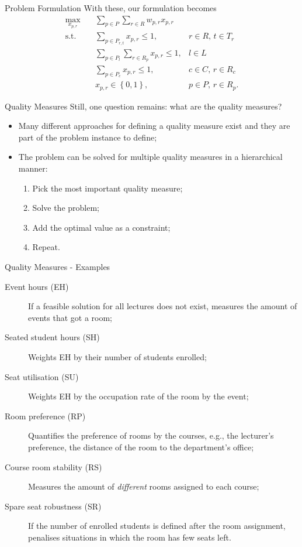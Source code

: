 \documentclass{beamer}
\begin{document}
\begin{frame}{Problem Formulation}
    With these, our formulation becomes
    \begin{align*}
        \max_{x_{p,r}} \quad & \sum_{p \in P} \sum_{r\in R} w_{p,r}x_{p,r} \\
	\textrm{s.t.} \quad & \sum_{p \in P_{r,t}} x_{p,r} \le 1, & r\in R,\,t\in T_r \\
			    & \sum_{p \in P_l} \sum_{r \in R_p} x_{p,r} \le 1, & l \in L \\
			    & \sum_{p \in P_c} x_{p,r} \le 1, & c \in C,\, r \in R_c \\
			    & x_{p,r} \in \left\{ 0,1 \right\}, & p \in P,\, r\in R_p
    .\end{align*}
\end{frame}

\begin{frame}{Quality Measures}
    Still, one question remains: what are the quality measures?

    \begin{itemize}
        \item Many different approaches for defining a quality measure exist and they are part of the problem instance to define;
	\item The problem can be solved for multiple quality measures in a hierarchical manner:
	    \begin{enumerate}
	        \item Pick the most important quality measure;
		\item Solve the problem;
		\item Add the optimal value as a constraint;
		\item Repeat.
	    \end{enumerate}
    \end{itemize}
\end{frame}

\begin{frame}{Quality Measures - Examples}
    \begin{description}
	\item[Event hours (EH)] If a feasible solution for all lectures does not exist, measures the amount of events that got a room;
	\item[Seated student hours (SH)] Weights EH by their number of students enrolled;
	\item[Seat utilisation (SU)] Weights EH by the occupation rate of the room by the event;
	\item[Room preference (RP)] Quantifies the preference of rooms by the courses, e.g., the lecturer's preference, the distance of the room to the department's office;
	\item[Course room stability (RS)] Measures the amount of \emph{different} rooms assigned to each course;
	\item[Spare seat robustness (SR)] If the number of enrolled students is defined after the room assignment, penalises situations in which the room has few seats left.
    \end{description}
\end{frame}
\end{document}
